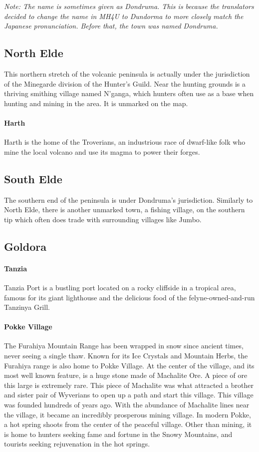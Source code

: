 \noindent\textit{Note: The name is sometimes given as Dondruma. This is because the translators decided to change the name in MH4U to Dundorma to more closely match the Japanese pronunciation. Before that, the town was named Dondruma.}

\subsection*{North Elde}
This northern stretch of the volcanic peninsula is actually under the jurisdiction of the Minegarde division of the Hunter's Guild.  Near the hunting grounds is a thriving smithing village named N'ganga, which hunters often use as a base when hunting and mining in the area.  It is unmarked on the map.


\paragraph{Harth} Harth is the home of the Troverians, an industrious race of dwarf-like folk who mine the local volcano and use its magma to power their forges.

\subsection*{South Elde}
The southern end of the peninsula is under Dondruma's jurisdiction.  Similarly to North Elde, there is another unmarked town, a fishing village, on the southern tip which often does trade with surrounding villages like Jumbo.

\subsection*{Goldora}
\paragraph{Tanzia} Tanzia Port is a bustling port located on a rocky cliffside in a tropical area, famous for its giant lighthouse and the delicious food of the felyne-owned-and-run Tanzinya Grill.

\paragraph{Pokke Village} The Furahiya Mountain Range has been wrapped in snow since ancient times, never seeing a single thaw. Known for its Ice Crystals and Mountain Herbs, the Furahiya range is also home to Pokke Village. At the center of the village, and its most well known feature, is a huge stone made of Machalite Ore. A piece of ore this large is extremely rare. This piece of Machalite was what attracted a brother and sister pair of Wyverians to open up a path and start this village. This village was founded hundreds of years ago. With the abundance of Machalite lines near the village, it became an incredibly prosperous mining village. In modern Pokke, a hot spring shoots from the center of the peaceful village. Other than mining, it is home to hunters seeking fame and fortune in the Snowy Mountains, and tourists seeking rejuvenation in the hot springs.

